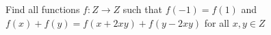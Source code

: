 Find all functions $f : Z \to Z$ such that $f(-1) = f(1)$ and $f(x)+ f(y) = f(x+2xy)+ f(y-2xy)$ for all $x,y \in Z$